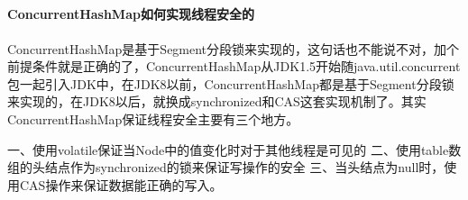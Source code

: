 \documentclass[../../../interview-questions.tex]{subfiles}
\begin{document}
\subsection{\color{red}{ConcurrentHashMap}}

\paragraph{ConcurrentHashMap如何实现线程安全的}

ConcurrentHashMap是基于Segment分段锁来实现的，这句话也不能说不对，加个前提条件就是正确的了，ConcurrentHashMap从JDK1.5开始随java.util.concurrent包一起引入JDK中，在JDK8以前，ConcurrentHashMap都是基于Segment分段锁来实现的，在JDK8以后，就换成synchronized和CAS这套实现机制了。其实ConcurrentHashMap保证线程安全主要有三个地方。

一、使用volatile保证当Node中的值变化时对于其他线程是可见的
二、使用table数组的头结点作为synchronized的锁来保证写操作的安全
三、当头结点为null时，使用CAS操作来保证数据能正确的写入。
\end{document}
